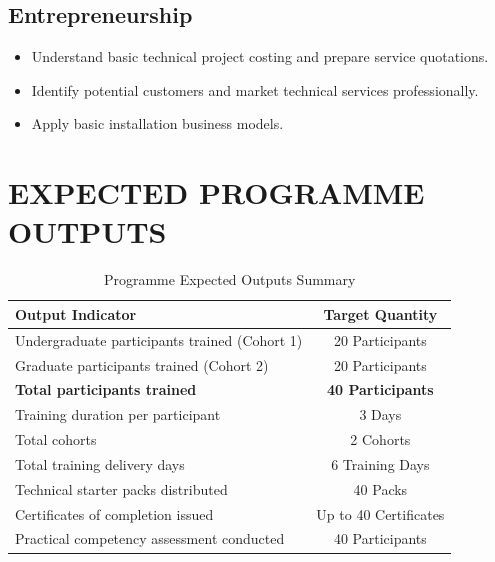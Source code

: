 \documentclass[11pt,a4paper]{article}
\newcommand{\checkicon}{\textcolor{baytblue}{\faCheckCircle}\ }
\begin{document}
\subsection{Entrepreneurship}
\begin{itemize}[label=\checkicon]
    \item Understand basic technical project costing and prepare service quotations.
    \item Identify potential customers and market technical services professionally.
    \item Apply basic installation business models.
\end{itemize}

\section{EXPECTED PROGRAMME OUTPUTS}

\begin{table}[h!]
\centering
{}
\begin{tabularx}{\textwidth}{X c}
\toprule
\rowcolor{baytnavy} \color{white}\textbf{Output Indicator} & \color{white}\textbf{Target Quantity} \\
\midrule
Undergraduate participants trained (Cohort 1) & 20 Participants \\
Graduate participants trained (Cohort 2) & 20 Participants \\
\textbf{Total participants trained} & \textbf{40 Participants} \\
Training duration per participant & 3 Days \\
Total cohorts & 2 Cohorts \\
Total training delivery days & 6 Training Days \\
Technical starter packs distributed & 40 Packs \\
Certificates of completion issued & Up to 40 Certificates \\
Practical competency assessment conducted & 40 Participants \\
\bottomrule
\end{tabularx}
\caption{Programme Expected Outputs Summary}
\end{table}

\end{document}
